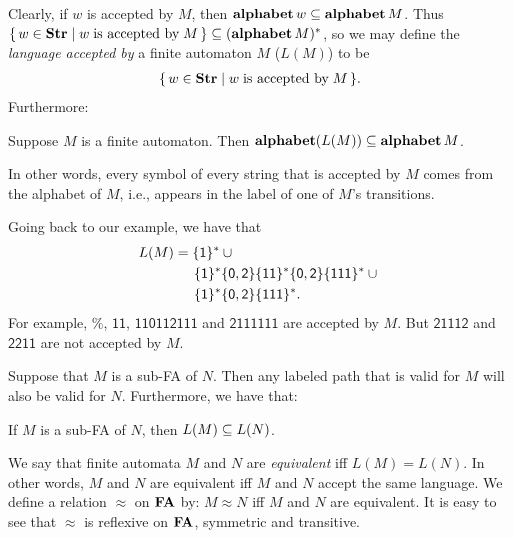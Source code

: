 %
%
%
Clearly, if $w$ is accepted by $M$, then
$\mathbf{alphabet}\,w\subseteq\mathbf{alphabet}\,M$.  Thus $\{ \, w\in\mathbf{Str} \mid w\;\allowbreak\mbox{is
    accepted by}\allowbreak\;M \, \}\subseteq(\mathbf{alphabet}\,M)^*$, so we may define the
\emph{language accepted by} a finite automaton $M$ ($L(M)$) to be
\begin{gather*}
\{ \, w\in\mathbf{Str} \mid w\;\allowbreak\mbox{is accepted by}\allowbreak\;M \, \}.
\end{gather*}
Furthermore:

\begin{proposition}
Suppose $M$ is a finite automaton.  Then $\mathbf{alphabet}(L(M))\subseteq\mathbf{alphabet}\,M$.
\end{proposition}

In other words, every symbol of every string that is accepted by $M$
comes from the alphabet of $M$, i.e., appears in the label of one of
$M$'s transitions.

Going back to our example, we have that
\begin{align*}
L(M) &= \{\mathsf{1}\}^* \cup {}\\
     &\quad\;\,\mathsf{\{1\}^*\{0,2\}\{11\}^*\{0,2\}\{111\}^*} \cup {} \\
     &\quad\;\,\mathsf{\{1\}^*\{0,2\}\{111\}^*} .
\end{align*}
For example, $\%$, $\mathsf{11}$, $\mathsf{110112111}$ and
$\mathsf{2111111}$ are accepted by $M$.  But $\mathsf{21112}$ and
$\mathsf{2211}$ are not accepted by $M$.

Suppose that $M$ is a sub-FA of $N$.  Then any labeled path that is
valid for $M$ will also be valid for $N$.  Furthermore, we have that:

\begin{proposition}
If $M$ is a sub-FA of $N$, then $L(M)\subseteq L(N)$.
\end{proposition}

%
%
%
We say that finite automata $M$ and $N$ are \emph{equivalent} iff
$L(M) = L(N)$.  In other words, $M$ and $N$ are equivalent iff $M$ and
$N$ accept the same language.  We define a relation $\approx$ on $\mathbf{FA}$
by: $M\approx N$ iff $M$ and $N$ are equivalent.  It is easy to see
that $\approx$ is reflexive on $\mathbf{FA}$, symmetric and transitive.

